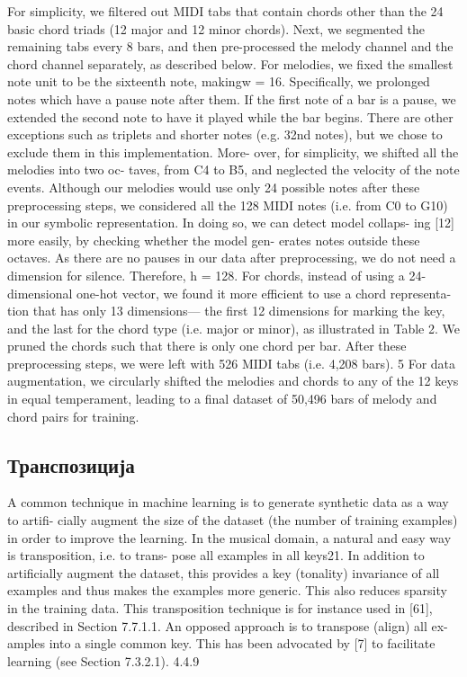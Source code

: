 \cite{Yang2017} 
For simplicity, we filtered out MIDI tabs that contain chords other than the 24 basic chord triads (12 major and 12 minor chords). Next, we segmented the remaining tabs every 8 bars, and then pre-processed the melody channel and the chord channel separately, as described below. For melodies, we fixed the smallest note unit to be the sixteenth note, makingw = 16. Specifically, we prolonged notes which have a pause note after them. If the first note of a bar is a pause, we extended the second note to have it played while the bar begins. There are other exceptions such as triplets and shorter notes (e.g. 32nd notes), but we chose to exclude them in this implementation. More- over, for simplicity, we shifted all the melodies into two oc- taves, from C4 to B5, and neglected the velocity of the note events. Although our melodies would use only 24 possible notes after these preprocessing steps, we considered all the 128 MIDI notes (i.e. from C0 to G10) in our symbolic representation. In doing so, we can detect model collaps- ing [12] more easily, by checking whether the model gen- erates notes outside these octaves. As there are no pauses in our data after preprocessing, we do not need a dimension for silence. Therefore, h = 128. For chords, instead of using a 24-dimensional one-hot vector, we found it more efficient to use a chord representa- tion that has only 13 dimensions— the first 12 dimensions for marking the key, and the last for the chord type (i.e. major or minor), as illustrated in Table 2. We pruned the chords such that there is only one chord per bar. After these preprocessing steps, we were left with 526 MIDI tabs (i.e. 4,208 bars). 5 For data augmentation, we circularly shifted the melodies and chords to any of the 12 keys in equal temperament, leading to a final dataset of 50,496 bars of melody and chord pairs for training.

\subsection{Транспозиција}

A common technique in machine learning is to generate synthetic data as a way to artifi- cially augment the size of the dataset (the number of training examples) in order to improve the learning. In the musical domain, a natural and easy way is transposition, i.e. to trans- pose all examples in all keys21. In addition to artificially augment the dataset, this provides a key (tonality) invariance of all examples and thus makes the examples more generic. This also reduces sparsity in the training data. This transposition technique is for instance used in [61], described in Section 7.7.1.1. An opposed approach is to transpose (align) all ex- amples into a single common key. This has been advocated by [7] to facilitate learning (see Section 7.3.2.1).
4.4.9

